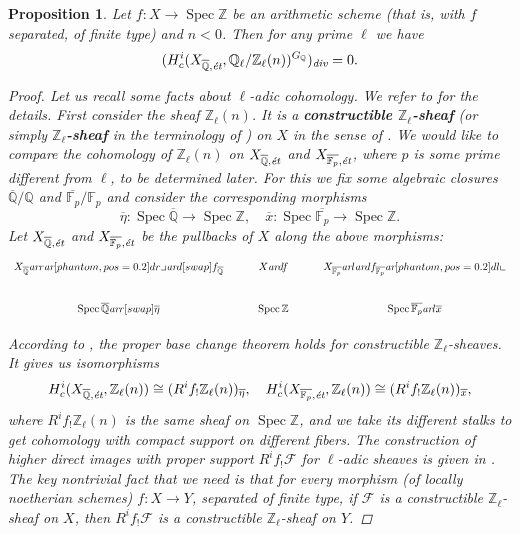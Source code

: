 \documentclass[leqno,12pt]{article}
\theoremstyle{plain}
\newtheorem{proposition}[theorem]{\indent\sc Proposition}
\theoremstyle{definition}
\DeclareMathOperator{\Spec}{Spec}
\newcommand{\FF}{\mathbb{F}}
\newcommand{\QQ}{\mathbb{Q}}
\newcommand{\ZZ}{\mathbb{Z}}
\renewcommand{\div}{\text{\it div}}
\newcommand{\ar}{\text{\it ar}}
\newcommand{\tikzpb}{\ar[phantom,pos=0.2]{dr}{\text{\large$\lrcorner$}}}
\newcommand{\tikzpbur}{\ar[phantom,pos=0.2]{dl}{\text{\large$\llcorner$}}}
\begin{document}
\begin{proposition}
  \label{prop:l-adic-cohomology-key-lemma}
  Let $f\colon X\to \Spec \ZZ$ be an arithmetic scheme (that is, with $f$
  separated, of finite type) and $n < 0$. Then for any prime $\ell$ we have
  $$(H^i_c (X_{\overline{\QQ},\text{\it \'{e}t}}, \QQ_\ell/\ZZ_\ell (n))^{G_\QQ})_\div = 0.$$

  \begin{proof}
    Let us recall some facts about $\ell$-adic cohomology. We refer to
    \cite[Expos\'{e}~VI]{SGA5} for the details. First consider the sheaf
    $\ZZ_\ell (n)$. It is a
    \textbf{constructible $\ZZ_\ell$-sheaf} (or simply
      \textbf{$\ZZ_\ell$-sheaf} in the terminology of \cite[Rapport]{SGA4-1-2})
    on $X$ in the sense of \cite[Expos\'{e}~VI, 1.1.1]{SGA5}. We would like to
    compare the cohomology of $\ZZ_\ell (n)$ on
    $X_{\overline{\QQ},\text{\it \'{e}t}}$ and $X_{\overline{\FF_p},\text{\it \'{e}t}}$,
    where $p$ is some prime different from $\ell$, to be determined later.
    For this we fix some algebraic closures $\overline{\QQ}/\QQ$ and
    $\overline{\FF_p}/\FF_p$ and consider the corresponding morphisms
    \[ \overline{\eta}\colon \Spec \overline{\QQ} \to \Spec \ZZ, \quad
    \overline{x}\colon \Spec \overline{\FF_p} \to \Spec \ZZ. \]
    Let $X_{\overline{\QQ},\text{\it \'{e}t}}$ and
    $X_{\overline{\FF_p},\text{\it \'{e}t}}$ be the pullbacks of $X$ along the above
    morphisms:
    \[ \begin{tikzcd}
      X_{\overline{\QQ}} \ar{r}\tikzpb\ar{d}[swap]{f_{\overline{\QQ}}} & X \ar{d}{f} & X_{\overline{\FF_p}} \ar{l}\ar{d}{f_{\overline{\FF_p}}}\tikzpbur \\
      \Spec \overline{\QQ} \ar{r}[swap]{\overline{\eta}} & \Spec \ZZ & \Spec \overline{\FF_p} \ar{l}{\overline{x}}
    \end{tikzcd} \]

    According to \cite[Expos\'{e}~VI, 2.2.3]{SGA5}, the proper base change theorem
    holds for constructible $\ZZ_\ell$-sheaves. It gives us isomorphisms
    \[ H^i_c (X_{\overline{\QQ}, \text{\it \'{e}t}}, \ZZ_\ell (n)) \cong (R^i f_! \ZZ_\ell (n))_{\overline{\eta}}, \quad
    H^i_c (X_{\overline{\FF_p}, \text{\it \'{e}t}}, \ZZ_\ell (n)) \cong (R^i f_! \ZZ_\ell (n))_{\overline{x}}, \]
    where $R^i f_! \ZZ_\ell (n)$ is the same sheaf on $\Spec \ZZ$, and we take
    its different stalks to get cohomology with compact support on different
    fibers. The construction of higher direct images with proper support
    $R^i f_! \mathcal{F}$ for $\ell$-adic sheaves is given in
    \cite[Expos\'{e}~VI, \S 2.2]{SGA5}. The key nontrivial fact that we need is that
    for every morphism (of locally noetherian schemes) $f\colon X\to Y$,
    separated of finite type, if $\mathcal{F}$ is a constructible
    $\ZZ_\ell$-sheaf on $X$, then $R^i f_! \mathcal{F}$ is a constructible
    $\ZZ_\ell$-sheaf on $Y$.


\end{proof}
\end{proposition}
\end{document}
